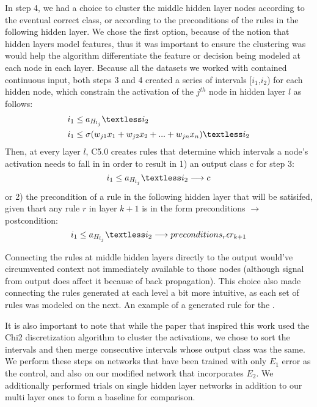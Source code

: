 In step 4, we had a choice to cluster the middle hidden layer nodes
according to the eventual correct class, or according to the
preconditions of the rules in the following hidden layer. We chose the
first option, because of the notion that hidden layers model features,
thus it was important to ensure the clustering was would help the
algorithm differentiate the feature or decision being modeled at each
node in each layer. Because all the datasets we worked with contained
continuous input, both steps 3 and 4 created a series of intervals [$i_1$,$i_2$) for
each hidden node, which constrain the activation of the $j^{th}$ node in hidden
layer $l$ as follows:
\begin{equation}
  \begin{split}
    &i_1 \le a_{H_{l_j}} \textless i_2 \\
    &i_1 \le \sigma(w_{j1}x_1 + w_{j2}x_2 + ... + w_{jn}x_n)  \textless i_2
  \end{split}
\end{equation}
Then, at every layer $l$, C5.0 creates rules that determine which intervals a node's
activation needs to fall in in order to result in 1) an output class c
for step 3:
\begin{equation}
  i_1 \le a_{H_{l_j}} \textless i_2  \longrightarrow  c
\end{equation}
or 2) the precondition of a rule in the following hidden layer that
will be satisifed, given thart any rule $r$ in layer $k + 1$ is in the form preconditions
$\longrightarrow$ postcondition:
\begin{equation}
  i_1 \le a_{H_{l_j}}  \textless i_2  \longrightarrow preconditions_r \epsilon r_{k+1}
\end{equation}

 Connecting the rules at middle hidden layers directly to the output
 would’ve circumvented context not immediately available to those
 nodes (although signal from output does affect it because of back
 propagation). This choice also made connecting the rules generated at
 each level a bit more intuitive, as each set of rules was modeled on
 the next. An example of a generated rule for the .

It is also important to note that while the paper
that inspired this work \cite{thuan11} used the Chi2 discretization
algorithm to cluster the activations, we chose to sort the intervals
and then merge consecutive intervals whose output class was the same. We perform these steps on networks that have been trained with only $E_1$
error as the control, and also on our modified network that
incorporates $E_2$. We additionally performed trials on single hidden
layer networks in addition to our multi layer ones to form a baseline
for comparison. 

